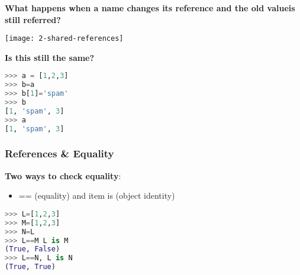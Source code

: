 \textbf{What happens when a name changes its reference and the old valueis still referred?}

\begin{center}
\texttt{[image: 2-shared-references]}
\end{center}

\textbf{Is this still the same?}

\begin{lstlisting}[language=Python]
>>> a = [1,2,3]  
>>> b=a
>>> b[1]='spam'
>>> b
[1, 'spam', 3]
>>> a
[1, 'spam', 3]
\end{lstlisting}

\subsubsection{References \& Equality}

\textbf{Two ways to check equality}:

\begin{itemize}
	\item == (equality) and
	item is (object identity)
\end{itemize}

\begin{lstlisting}[language=Python]
>>> L=[1,2,3]
>>> M=[1,2,3]
>>> N=L
>>> L==M L is M
(True, False)
>>> L==N, L is N
(True, True)
\end{lstlisting}

